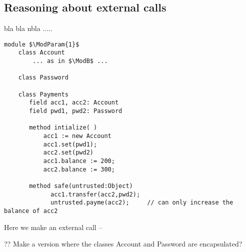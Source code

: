 \subsection{Reasoning about external calls}
\label{sec:how}

bla bla nbla .....

%
 

\begin{lstlisting}[mathescape=true, language=chainmail, frame=lines]
module $\ModParam{1}$
    class Account 
        ... as in $\ModB$ ...
        
    class Password
    
    class Payments
       field acc1, acc2: Account
       field pwd1, pwd2: Password
       
       method intialize( )
           acc1 := new Account
           acc1.set(pwd1);
           acc2.set(pwd2)
           acc1.balance := 200;
           acc2.balance := 300;
          
       method safe(untrusted:Object)
             acc1.transfer(acc2,pwd2);
             untrusted.payme(acc2);     // can only increase the balance of acc2

\end{lstlisting}
 
 
 Here we make an external call --    
 
 ?? Make a version where the classes Account and Password are encapsulated?

